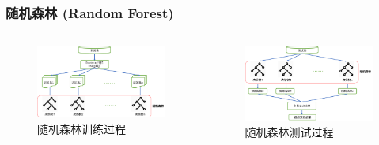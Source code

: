 \documentclass[10pt,aspectratio=43,mathserif]{beamer}
\begin{document}
        \begin{frame}
            \frametitle{\textbf{随机森林 (Random Forest)}}
              \begin{columns}
                  \footnotesize
                  \begin{figure}[!t]
                      \centering
                      \includegraphics[width=1.15\textwidth]{figures/rf_training.png}
                      \caption{随机森林训练过程}
                  \end{figure}
  
                  \begin{figure}[!t]
                      \centering
                      \includegraphics[width=1.1\textwidth]{figures/rf_testing.png}
                      \caption{随机森林测试过程}
                  \end{figure}
              \end{columns}
          \end{frame}
\end{document}
